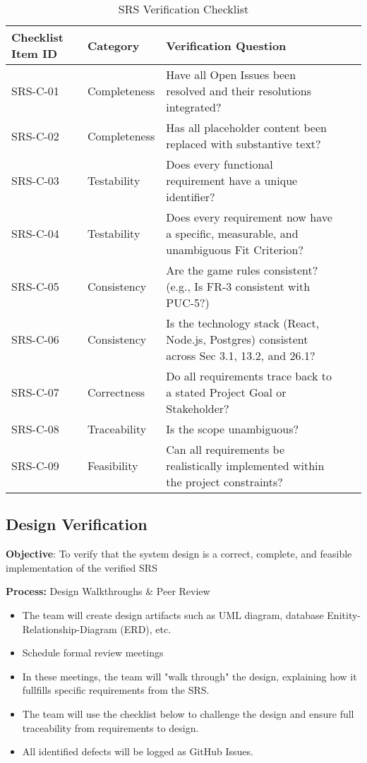 \documentclass[12pt, titlepage]{article}
\begin{document}
\begin{table}[H]
\centering
\caption{SRS Verification Checklist}
\label{tab:srs-checklist}
\begin{tabular}{|l|l|p{}|l|l|}
\hline
\textbf{Checklist Item ID} & \textbf{Category} & \textbf{Verification Question} \\ \hline
SRS-C-01 & Completeness & Have all Open Issues been resolved and their resolutions integrated?  \\ \hline
SRS-C-02 & Completeness & Has all placeholder content been replaced with substantive text? \\ \hline
SRS-C-03 & Testability & Does every functional requirement have a unique identifier? \\ \hline
SRS-C-04 & Testability & Does every requirement now have a specific, measurable, and unambiguous Fit Criterion? \\ \hline
SRS-C-05 & Consistency & Are the game rules consistent? (e.g., Is FR-3 consistent with PUC-5?)  \\ \hline
SRS-C-06 & Consistency & Is the technology stack (React, Node.js, Postgres) consistent across Sec 3.1, 13.2, and 26.1? \\ \hline
SRS-C-07 & Correctness & Do all requirements trace back to a stated Project Goal or Stakeholder? \\ \hline
SRS-C-08 & Traceability & Is the scope unambiguous? \\ \hline
SRS-C-09 & Feasibility & Can all requirements be realistically implemented within the project constraints? \\ \hline
\end{tabular}
\end{table}


\subsection{Design Verification}
\noindent \textbf{Objective}: To verify that the system design is a correct, complete, and feasible implementation of the verified SRS

\noindent \textbf{Process:} Design Walkthroughs \& Peer Review
\begin{itemize}
	\item The team will create design artifacts such as UML diagram, database Enitity-Relationship-Diagram (ERD), etc.
	\item Schedule formal review meetings
	\item In these meetings, the team will "walk through" the design, explaining how it fullfills specific requirements from the SRS.
	\item The team will use the checklist below to challenge the design and ensure full traceability from requirements to design.
	\item All identified defects will be logged as GitHub Issues.
\end{itemize}
\end{document}
